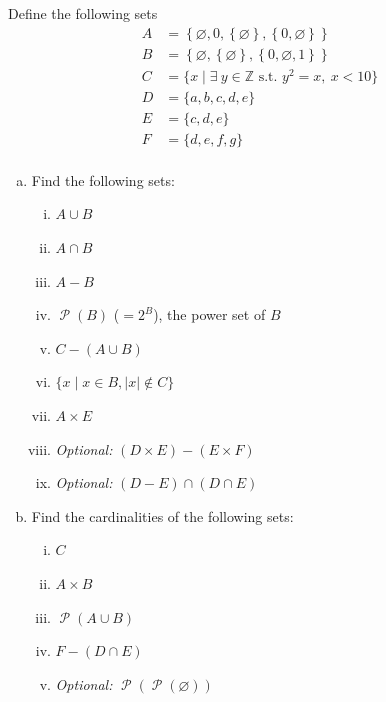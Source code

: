 \documentclass[12pt,letterpaper]{article}
\newcommand\Z{\mathbb Z}
\newcommand\Pow{\ensuremath{\operatorname{\mathcal{P}}}}
\newif\ifsol
\newcommand{\solu}[2]{ \begin{mdframed} \ifsol #2 \else \vspace{#1} \fi \end{mdframed} }
\begin{document}
Define the following sets
\begin{align*}
	A &= \left\{\varnothing, 0, \left\{\varnothing\right\},
\left\{0,\varnothing\right\} \right\} \\
	B &= \left\{\varnothing, \left\{\varnothing\right\},
\left\{0, \varnothing, 1\right\} \right\} \\
	C &= \{x \mid \exists \ y \in \Z \text{ s.t. } y^2=x, \ x < 10 \} \\
    D &= \{a, b, c, d, e\} \\
    E &= \{c, d, e\} \\
    F &= \{d, e, f, g\} \\
\end{align*}
\begin{enumerate}[a.]
    \item Find the following sets:
  		\begin{enumerate}[i.]
  			\item $A \cup B$
      		\item $A \cap B$
      		\item $A - B$
      		\item $\Pow(B)$ ($=2^B$), the power set of $B$
      		\item $C - (A \cup B)$
      		\item $\{x \mid x \in B, |x| \notin C\}$
            \item $A \times E$
            \item \textit{Optional: }$(D \times E) - (E \times F)$
            \item \textit{Optional: }$(D - E) \cap (D \cap E)$
	   \end{enumerate}
  \item Find the cardinalities of the following sets:
        \begin{enumerate}[i.]
          \item $C$
          \item $A \times B$
          \item $\Pow(A \cup B)$
          \item $F - (D \cap E)$
          \item \textit{Optional: }$\Pow(\Pow(\varnothing))$
        \end{enumerate}
    \solu{5cm}{
    \begin{enumerate}
        \item \begin{enumerate}[i.]
      		\item
            $\left\{\varnothing,0,\left\{\varnothing\right\},
            \left\{0,\varnothing\right\},
            \left\{0,\varnothing,1\right\}\right\}$
      		\item
            $\left\{\varnothing,\left\{\varnothing\right\}\right\}$
      		\item
            $\left\{0, \left\{0,\varnothing\right\}\right\}$
      		\item
  				$\Big\{\hspace*{2pt} \varnothing, \left\{\varnothing\right\},
  				\left\{\left\{\varnothing\right\}\right\},
              \left\{\left\{0,\varnothing,1\right\}\right\},$


\end{enumerate}
\end{enumerate}}
\end{enumerate}
\end{document}
